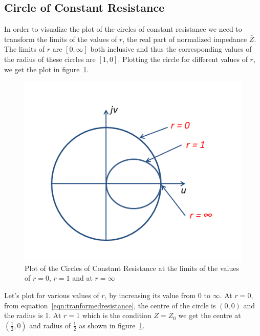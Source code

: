 \subsection{Circle of Constant Resistance}
In order to visualize the plot of the circles of constant resistance we need to transform the limits of the values of $r$, the real part of normalized impedance $\bar{Z}$. The limits of $r$ are $[0, \infty]$ both inclusive and thus the corresponding values of the radius of these circles are $[1, 0]$. Plotting the circle for different values of $r$, we get the plot in figure~\ref{fig:ouytre}.
\begin{figure}[h]
\centering
\includegraphics[width=1\linewidth]{./graphics/fig2.35}
\caption{Plot of the Circles of Constant Resistance at the limits of the values of $r = 0$, $r = 1$ and at $r = \infty$}
\label{fig:ouytre}
\end{figure}

Let's plot for various values of $r$, by increasing its value from 0 to $\infty$. At $r = 0$, from equation~\eqref{eqn:tranformedresistance}, the centre of the circle is $(0,0)$ and the radius is 1. At $r = 1$ which is the condition $Z = Z_0$ we get the centre at $\left(\frac{1}{2}, 0\right)$ and radius of $\frac{1}{2}$ as shown in figure~\ref{fig:ouytre}.

